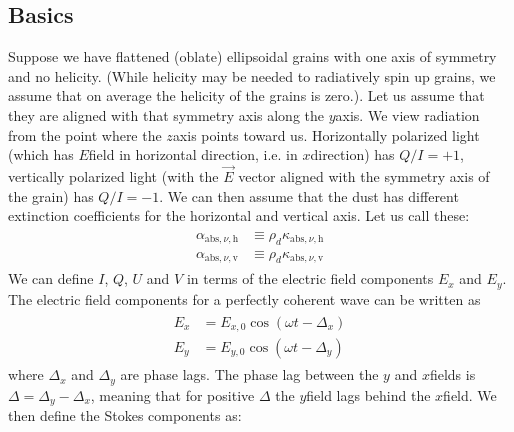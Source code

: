 \documentclass[letterpaper,10pt,english]{sphinxmanual}
\begin{document}
\subsection{Basics}
\label{\detokenize{dustradtrans:basics}}\label{\detokenize{dustradtrans:sec-basic-equations}}
Suppose we have flattened (oblate) ellipsoidal grains with one axis of symmetry
and no helicity. (While helicity may be needed to radiatively spin up grains, we
assume that on average the helicity of the grains is zero.). Let us assume that
they are aligned with that symmetry axis along the \(y\)\sphinxhyphen{}axis. We view
radiation from the point where the \(z\)\sphinxhyphen{}axis points toward us. Horizontally
polarized light (which has \(E\)\sphinxhyphen{}field in horizontal direction, i.e. in
\(x\)\sphinxhyphen{}direction) has \(Q/I=+1\), vertically polarized light (with the
\(\vec E\) vector aligned with the symmetry axis of the grain) has
\(Q/I=-1\). We can then assume that the dust has different extinction
coefficients for the horizontal and vertical axis. Let us call these:
\begin{equation*}
\begin{split}\begin{split}
\alpha_{\mathrm{abs},\nu,\mathrm{h}} &\equiv \rho_d\kappa_{\mathrm{abs},\nu,\mathrm{h}}\\
\alpha_{\mathrm{abs},\nu,\mathrm{v}} &\equiv \rho_d\kappa_{\mathrm{abs},\nu,\mathrm{v}}
\end{split}\end{split}
\end{equation*}
We can define \(I\), \(Q\), \(U\) and \(V\) in terms of the electric field
components \(E_x\) and \(E_y\). The electric field components for a perfectly
coherent wave can be written as
\begin{equation*}
\begin{split}\begin{split}
E_x&=E_{x,0}\cos(\omega t-\Delta_x)\\
E_y&=E_{y,0}\cos(\omega t-\Delta_y)
\end{split}\end{split}
\end{equation*}
where \(\Delta_x\) and \(\Delta_y\) are phase lags. The phase lag between
the \(y\) and \(x\)\sphinxhyphen{}fields is \(\Delta=\Delta_y-\Delta_x\), meaning that for
positive \(\Delta\) the \(y\)\sphinxhyphen{}field lags behind the \(x\)\sphinxhyphen{}field. We then
define the Stokes components as:
\end{document}
